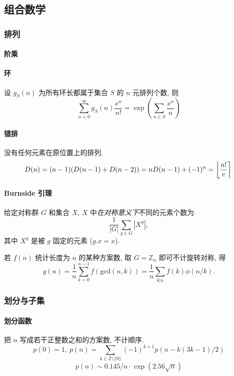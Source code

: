 \subsection{组合数学}

\subsubsection{排列}
	\paragraph{阶乘}
		

	\paragraph{环}
		设 $g_S(n)$ 为所有环长都属于集合 $S$ 的 $n$ 元排列个数, 则
		$$\sum_{n=0} ^\infty g_S(n) \frac{x^n}{n!} = \exp\left(\sum_{n\in S} \frac{x^n} {n} \right)$$

	\paragraph{错排}
		没有任何元素在原位置上的排列.
		\[ \mkern-2mu D(n) = (n-1)(D(n-1)+D(n-2)) = n D(n-1)+(-1)^n = \left\lfloor\frac{n!}{e}\right\rceil \]

	\paragraph{Burnside 引理}
		给定对称群 $G$ 和集合 $X$, $X$ 中\emph{在对称意义下}不同的元素个数为
		 \[ {\frac {1}{|G|}}\sum _{{g\in G}}|X^{g}|, \]
		 其中 $X^{g}$ 是被 $g$ 固定的元素 ($g.x = x$).

		 若 $f(n)$ 统计长度为 $n$ 的某种方案数, 取 $G = \mathbb Z_n$ 即可不计旋转对称, 得
		 \[ g(n) = \frac 1 n \sum_{k=0}^{n-1}{f(\text{gcd}(n, k))} = \frac 1 n \sum_{k|n}{f(k)\phi(n/k)}. \]

\subsubsection{划分与子集}
	\paragraph{划分函数}
		把 $n$ 写成若干正整数之和的方案数, 不计顺序.
		\[ p(0) = 1,\ p(n) = \sum_{k \in \mathbb Z \setminus \{0\}}{(-1)^{k+1} p(n - k(3k-1) / 2)} \]
		\[ p(n) \sim 0.145 / n \cdot \exp(2.56 \sqrt{n}) \]

